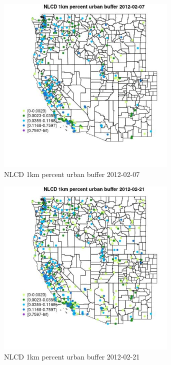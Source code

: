 \begin{figure} 
\centering  
\includegraphics[width=0.77\textwidth]{Code_Outputs/Report_ML_input_PM25_Step4_part_f_de_duplicated_aveswNAs_MapObsNLCD_1km_percent_urban_buffer2012-02-07.jpg} 
\caption{\label{fig:Report_ML_input_PM25_Step4_part_f_de_duplicated_aveswNAsMapObsNLCD_1km_percent_urban_buffer2012-02-07}NLCD 1km percent urban buffer 2012-02-07} 
\end{figure} 
 

\clearpage 

\begin{figure} 
\centering  
\includegraphics[width=0.77\textwidth]{Code_Outputs/Report_ML_input_PM25_Step4_part_f_de_duplicated_aveswNAs_MapObsNLCD_1km_percent_urban_buffer2012-02-21.jpg} 
\caption{\label{fig:Report_ML_input_PM25_Step4_part_f_de_duplicated_aveswNAsMapObsNLCD_1km_percent_urban_buffer2012-02-21}NLCD 1km percent urban buffer 2012-02-21} 
\end{figure} 
 

